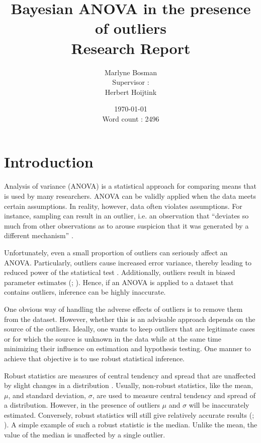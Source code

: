 \documentclass[11pt, a4paper]{article}
\title{{\huge Bayesian ANOVA in the presence of outliers} \vspace{0.5cm} \\ \LARGE Research Report}
\author{Marlyne Bosman \vspace{0.5cm} \\
Supervisor :\\ Herbert Hoijtink}
\date{\today  \vspace{0.5cm}\\
Word count : 2496}
\begin{document}
\maketitle

\section{Introduction}
Analysis of variance (ANOVA) is a statistical approach for comparing means that is used by many researchers.
ANOVA can be validly applied when the data meets certain assumptions. 
In reality, however, data often violates assumptions.
For instance, sampling can result in an outlier, i.e. an observation that ``deviates so much from other observations as to arouse suspicion that it was generated by a different mechanism'' \citep[p.~1]{Hawkins1980}.

Unfortunately, even a small proportion of outliers can seriously affect an ANOVA.
Particularly, outliers cause increased error variance, thereby leading to reduced power of the statistical test \citep[p.~2]{Wilcox2017}.
Additionally, outliers result in biased parameter estimates (\citealt{Ruckstuhl2014}; \citealt[p.~7]{Wilcox2017}).
Hence, if an ANOVA is applied to a dataset that contains outliers, inference can be highly inaccurate.

One obvious way of handling the adverse effects of outliers is to remove them from the dataset. 
However, whether this is an advisable approach depends on the source of the outliers.
Ideally, one wants to keep outliers that are legitimate cases or for which the source is unknown in the data while at the same time minimizing their influence on estimation and hypothesis testing. 
One manner to achieve that objective is to use robust statistical inference.

Robust statistics are measures of central tendency and spread that are unaffected by slight changes in a distribution \citep[p.~25]{Wilcox2017}. 
Usually, non-robust statistics, like the mean, $\mu$, and standard deviation, $\sigma$, are used to measure central tendency and spread of a distribution. 
However, in the presence of outliers $\mu$ and $\sigma$ will be inaccurately estimated. 
Conversely, robust statistics will still give relatively accurate results
(\citealt{Ruckstuhl2014}; \citealt[pp.~25-31]{Wilcox2017}). 
A simple example of such a robust statistic is the median. 
Unlike the mean, the value of the median is unaffected by a single outlier.
\end{document}
